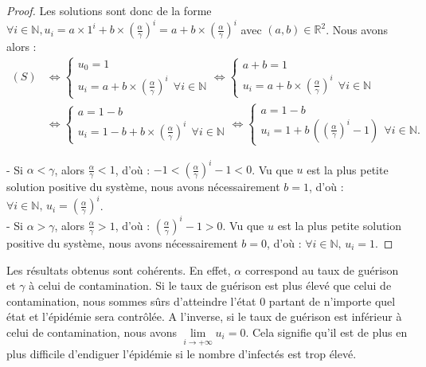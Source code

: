 \documentclass[12pt,a4paper]{report}
\theoremstyle{remark}
\begin{document}
\begin{proof}
Les solutions sont donc de la forme $\forall i \in \mathbb {N}, u_i = a \times 1^i + b \times (\frac{\alpha}{\gamma})^i = a+b\times (\frac{\alpha}{\gamma})^i$ avec $(a,b) \in \mathbb{R}^2$. Nous avons alors :
\\
\begin{align*}
(S) &\iff \left\{
\begin{array}{ll}
        u_0=1\\
        u_i=a+b\times \left(\frac{\alpha}{\gamma}\right)^i  \ \ \forall i \in \mathbb{N}
    \end{array}
\right. 
\iff \left\{
\begin{array}{ll}
        a+b=1\\
        u_i=a+b\times \left(\frac{\alpha}{\gamma}\right)^i \ \ \forall i \in \mathbb{N}
    \end{array}
\right. \\
&\iff \left\{
\begin{array}{ll}
        a=1-b\\
        u_i=1-b+b\times \left(\frac{\alpha}{\gamma}\right)^i \ \ \forall i \in \mathbb{N}
    \end{array}
\right.
\iff \left\{
\begin{array}{ll}
        a=1-b\\
        u_i=1+b \, \left(\left(\frac{\alpha}{\gamma}\right)^i - 1\right)\ \ \forall i \in \mathbb{N}.
    \end{array}
\right.
\end{align*}

- Si $\alpha < \gamma$, alors $\frac{\alpha}{\gamma} < 1$, d'où : $-1 < \left(\frac{\alpha}{\gamma}\right)^i - 1 < 0$. Vu que $u$ est la plus petite solution positive du système, nous avons nécessairement $b = 1$, d'où : $\forall i \in \mathbb{N}, \, u_i = \left(\frac{\alpha}{\gamma}\right)^i$.\\

- Si $\alpha > \gamma$, alors $\frac{\alpha}{\gamma} > 1$, d'où : $\left(\frac{\alpha}{\gamma}\right)^i - 1 > 0$. Vu que $u$ est la plus petite solution positive du système, nous avons nécessairement $b = 0$, d'où : $\forall i \in \mathbb{N}, \, u_i =1$.
\end{proof}

Les résultats obtenus sont cohérents. En effet, $\alpha$ correspond au taux de guérison et $\gamma$ à celui de contamination. Si le taux de guérison est plus élevé que celui de contamination, nous sommes sûrs d'atteindre l'état $0$ partant de n'importe quel état et l'épidémie sera contrôlée. A l'inverse, si le taux de guérison est inférieur à celui de contamination, nous avons $\lim\limits_{i \to +\infty} u_i = 0$. Cela signifie qu'il est de plus en plus difficile d'endiguer l'épidémie si le nombre d'infectés est trop élevé.
\\
\end{document}
